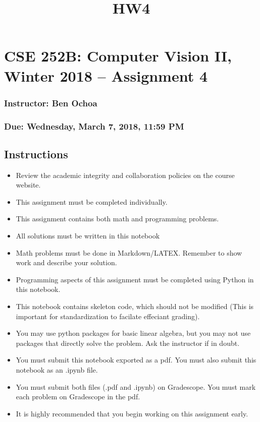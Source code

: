 \documentclass[11pt]{article}
\title{HW4}
\providecommand{\tightlist}{%
      \setlength{\itemsep}{0pt}\setlength{\parskip}{0pt}}
\begin{document}
    
    
    \maketitle
    
    

    
    \section{CSE 252B: Computer Vision II, Winter 2018 -- Assignment
4}\label{cse-252b-computer-vision-ii-winter-2018-assignment-4}

\subsubsection{Instructor: Ben Ochoa}\label{instructor-ben-ochoa}

\subsubsection{Due: Wednesday, March 7, 2018, 11:59
PM}\label{due-wednesday-march-7-2018-1159-pm}

    \subsection{Instructions}\label{instructions}

\begin{itemize}
\tightlist
\item
  Review the academic integrity and collaboration policies on the course
  website.
\item
  This assignment must be completed individually.
\item
  This assignment contains both math and programming problems.
\item
  All solutions must be written in this notebook
\item
  Math problems must be done in Markdown/LATEX. Remember to show work
  and describe your solution.
\item
  Programming aspects of this assignment must be completed using Python
  in this notebook.
\item
  This notebook contains skeleton code, which should not be modified
  (This is important for standardization to facilate effeciant grading).
\item
  You may use python packages for basic linear algebra, but you may not
  use packages that directly solve the problem. Ask the instructor if in
  doubt.
\item
  You must submit this notebook exported as a pdf. You must also submit
  this notebook as an .ipynb file.
\item
  You must submit both files (.pdf and .ipynb) on Gradescope. You must
  mark each problem on Gradescope in the pdf.
\item
  It is highly recommended that you begin working on this assignment
  early.
\end{itemize}
\end{document}
